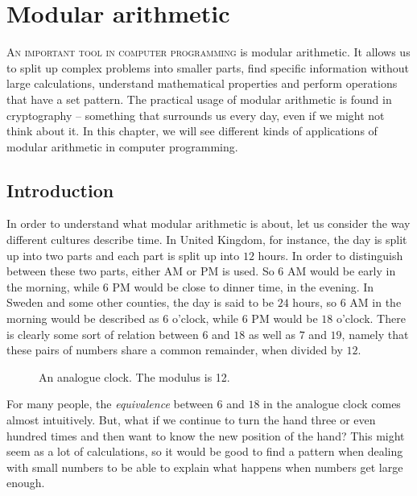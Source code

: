 \chapter{Modular arithmetic}
\textsc{An important tool in computer programming} is modular arithmetic. It allows us to split up complex problems into smaller parts, find specific information without large calculations, understand mathematical properties and perform operations that have a set pattern. The practical usage of modular arithmetic is found in cryptography -- something that surrounds us every day, even if we might not think about it. In this chapter, we will see different kinds of applications of modular arithmetic in computer programming. %

\section{Introduction} %
In order to understand what modular arithmetic is about, let us consider the way different cultures describe time. In United Kingdom, for instance, the day is split up into two parts and each part is split up into $12$ hours. In order to distinguish between these two parts, either AM or PM is used. So $6$ AM would be early in the morning, while $6$ PM would be close to dinner time, in the evening. In Sweden and some other counties, the day is said to be $24$ hours, so $6$ AM in the morning would be described as $6$ o'clock, while $6$ PM would be $18$ o'clock. There is clearly some sort of relation between $6$ and $18$ as well as $7$ and $19$, namely that these pairs of numbers share a common remainder, when divided by $12$.
\begin{figure}[h]
\begin{center}
\end{center}
\caption{An analogue clock. The modulus is 12.}
\label{Analogue1}
\end{figure}
For many people, the \textit{equivalence} between $6$ and $18$ in the analogue clock comes almost intuitively. But, what if we continue to turn the hand three or even hundred times and then want to know the new position of the hand? This might seem as a lot of calculations, so it would be good to find a pattern when dealing with small numbers to be able to explain what happens when numbers get large enough.

